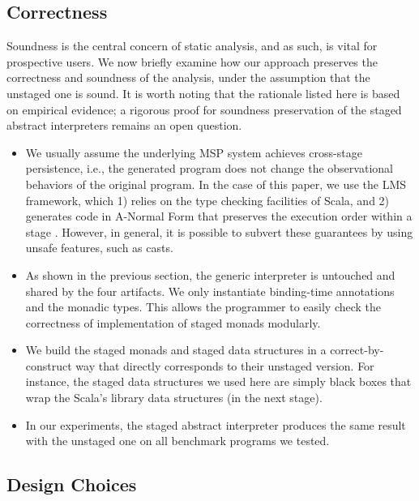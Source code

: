 
\subsection{Correctness}

Soundness is the central concern of static analysis, and as such, is vital
for prospective users. We now briefly examine how our
approach preserves the correctness and soundness of the analysis, under the
assumption that the unstaged one is sound. It is worth noting that the rationale
listed here is based on empirical evidence; a rigorous proof for soundness
preservation of the staged abstract interpreters remains an open question.

\begin{itemize}
  \item We usually assume the underlying MSP system achieves cross-stage
    persistence, i.e., the generated program does not change the observational
    behaviors of the original program. In the case of this paper, we use the
    LMS framework, which 1) relies on the type checking facilities of Scala, and
    2) generates code in A-Normal Form \cite{Flanagan:1993:ECC:155090.155113}
    that preserves the execution order within a stage \cite{DBLP:conf/birthday/Rompf16}.
    However, in general, it is possible to subvert these guarantees by
    using unsafe features, such as casts.
  \item As shown in the previous section, the generic interpreter is untouched
    and shared by the four artifacts. We only instantiate binding-time
    annotations and the monadic types. This allows the programmer to easily
    check the correctness of implementation of staged monads modularly.
  \item We build the staged monads and staged data structures in a
    correct-by-construct way that directly corresponds to their unstaged
    version. For instance, the staged data structures we used here are simply
    black boxes that wrap the Scala's library data structures (in the next
    stage).
  \item In our experiments, the staged abstract interpreter produces the same
    result with the unstaged one on all benchmark programs we tested.
\end{itemize}

\subsection{Design Choices}

